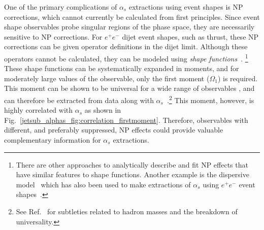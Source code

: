 \documentclass[11pt]{cernrep}
\begin{document}
One of the primary complications of $\alpha_s$ extractions using event shapes is NP corrections, which cannot currently be calculated from first principles.
%
Since event shape observables probe singular regions of the phase space, they are necessarily sensitive to NP corrections.  
%
For $e^+e^-$ dijet event shapes, such as thrust, these NP corrections can be given operator definitions in the dijet limit.
%
Although these operators cannot be calculated, they can be modeled using \textit{shape functions}~\cite{Korchemsky:1999kt,Korchemsky:2000kp,Hoang:2007vb,Ligeti:2008ac}.%
\footnote{There are other approaches to analytically describe and fit NP effects that have similar features to shape functions.  Another example is the dispersive model~\cite{Dokshitzer:1995qm,Dokshitzer:1995zt} which has also been used to make extractions of $\alpha_s$ using $e^+e^-$ event shapes~\cite{Gehrmann:2012sc}.}
%
These shape functions can be systematically expanded in moments, and for moderately large values of the observable, only the first moment ($\Omega_1$) is required.
%
This moment can be shown to be universal for a wide range of observables \cite{Lee:2006fn,Lee:2007jr}, and can therefore be extracted from data along with $\alpha_s$~\cite{Abbate:2010xh,Abbate:2012jh,Hoang:2015hka}.\footnote{See Ref.~\cite{Salam:2001bd,Mateu:2012nk} for subtleties related to hadron masses and the breakdown of universality.}
%
This moment, however, is highly correlated with $\alpha_s$ as shown in Fig.~\ref{jetsub_alphas_fig:correlation_firstmoment}.
%
Therefore, observables with different, and preferably suppressed, NP effects could provide valuable complementary information for $\alpha_s$ extractions.
%
\end{document}
